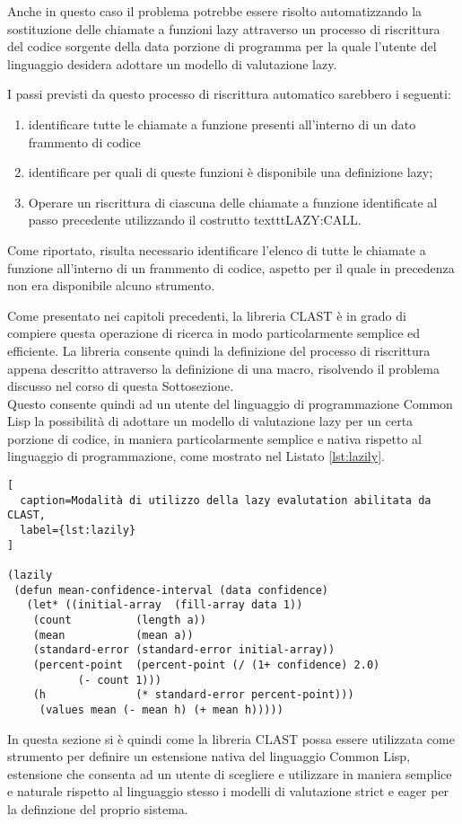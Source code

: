 Anche in questo caso il problema potrebbe essere risolto automatizzando la
sostituzione delle chiamate a funzioni lazy attraverso un processo di
riscrittura del codice sorgente della data porzione di programma per la quale
l'utente del linguaggio desidera adottare un modello di valutazione lazy.

I passi previsti da questo processo di riscrittura automatico sarebbero i
seguenti:

\begin{enumerate}

\item identificare tutte le chiamate a funzione presenti all'interno di un dato
frammento di codice

\item identificare per quali di queste funzioni è disponibile una definizione
lazy;

\item Operare un riscrittura di ciascuna delle chiamate a funzione identificate
al passo precedente utilizzando il costrutto texttt{LAZY:CALL}.

\end{enumerate}

Come riportato, risulta necessario identificare l'elenco di tutte le chiamate a
funzione all'interno di un frammento di codice, aspetto per il quale in
precedenza non era disponibile alcuno strumento.

Come presentato nei capitoli precedenti, la libreria CLAST è in grado di
compiere questa operazione di ricerca in modo particolarmente semplice ed
efficiente. La libreria consente quindi la definizione del processo di
riscrittura appena descritto attraverso la definizione di una macro, risolvendo
il problema discusso nel corso di questa Sottosezione.\\

Questo consente quindi ad un utente del linguaggio di programmazione Common Lisp
la possibilità di adottare un modello di valutazione lazy per un certa porzione
di codice, in maniera particolarmente semplice e nativa rispetto al linguaggio
di programmazione, come mostrato nel Listato \ref{lst:lazily}.

\begin{lstlisting}[
  caption=Modalità di utilizzo della lazy evalutation abilitata da CLAST,
  label={lst:lazily}
]

(lazily
 (defun mean-confidence-interval (data confidence)
   (let* ((initial-array  (fill-array data 1))
    (count          (length a))
    (mean           (mean a))
    (standard-error (standard-error initial-array))
    (percent-point  (percent-point (/ (1+ confidence) 2.0)
           (- count 1)))
    (h              (* standard-error percent-point)))
     (values mean (- mean h) (+ mean h)))))

\end{lstlisting}

In questa sezione si è quindi come la libreria CLAST possa essere utilizzata
come strumento per definire un estensione nativa del linguaggio Common Lisp,
estensione che consenta ad un utente di scegliere e utilizzare in maniera
semplice e naturale rispetto al linguaggio stesso i modelli di valutazione
strict e eager per la definzione del proprio sistema.
